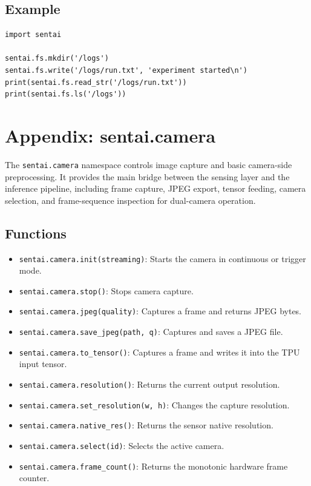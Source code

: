 \subsection{Example}\label{example-4}

\begin{verbatim}
import sentai

sentai.fs.mkdir('/logs')
sentai.fs.write('/logs/run.txt', 'experiment started\n')
print(sentai.fs.read_str('/logs/run.txt'))
print(sentai.fs.ls('/logs'))
\end{verbatim}

\section{Appendix: sentai.camera}\label{appendix-sentai.camera}

The \texttt{sentai.camera} namespace controls image capture and basic
camera-side preprocessing. It provides the main bridge between the
sensing layer and the inference pipeline, including frame capture, JPEG
export, tensor feeding, camera selection, and frame-sequence inspection
for dual-camera operation.

\subsection{Functions}\label{functions-5}

\begin{itemize}
\tightlist
\item
  \texttt{sentai.camera.init(streaming)}: Starts the camera in
  continuous or trigger mode.
\item
  \texttt{sentai.camera.stop()}: Stops camera capture.
\item
  \texttt{sentai.camera.jpeg(quality)}: Captures a frame and returns
  JPEG bytes.
\item
  \texttt{sentai.camera.save\_jpeg(path,\ q)}: Captures and saves a JPEG
  file.
\item
  \texttt{sentai.camera.to\_tensor()}: Captures a frame and writes it
  into the TPU input tensor.
\item
  \texttt{sentai.camera.resolution()}: Returns the current output
  resolution.
\item
  \texttt{sentai.camera.set\_resolution(w,\ h)}: Changes the capture
  resolution.
\item
  \texttt{sentai.camera.native\_res()}: Returns the sensor native
  resolution.
\item
  \texttt{sentai.camera.select(id)}: Selects the active camera.
\item
  \texttt{sentai.camera.frame\_count()}: Returns the monotonic hardware
  frame counter.
\end{itemize}

